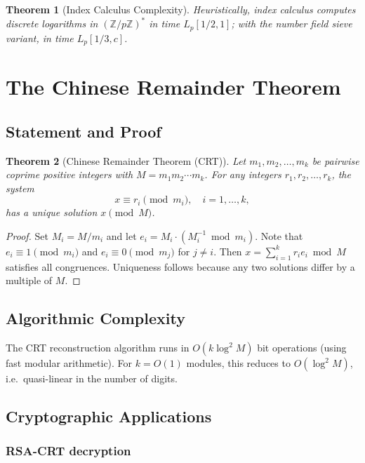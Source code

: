 \documentclass[12pt,a4paper]{amsart}
\newtheorem{theorem}{Theorem}[section]
\theoremstyle{definition}
\begin{document}
\begin{theorem}[Index Calculus Complexity]
Heuristically, index calculus computes discrete logarithms in
$(\mathbb{Z}/p\mathbb{Z})^*$ in time $L_p[1/2, 1]$; with the number field
sieve variant, in time $L_p[1/3, c]$.
\end{theorem}

\section{The Chinese Remainder Theorem}

\subsection{Statement and Proof}

\begin{theorem}[Chinese Remainder Theorem (CRT)]
Let $m_1, m_2, \ldots, m_k$ be pairwise coprime positive integers with
$M = m_1 m_2 \cdots m_k$. For any integers $r_1, r_2, \ldots, r_k$, the
system
\[
  x \equiv r_i \pmod{m_i}, \quad i = 1, \ldots, k,
\]
has a unique solution $x \pmod{M}$.
\end{theorem}

\begin{proof}
Set $M_i = M/m_i$ and let $e_i = M_i \cdot (M_i^{-1} \bmod m_i)$. Note that
$e_i \equiv 1 \pmod{m_i}$ and $e_i \equiv 0 \pmod{m_j}$ for $j \ne i$.
Then $x = \sum_{i=1}^k r_i e_i \bmod M$ satisfies all congruences. Uniqueness
follows because any two solutions differ by a multiple of $M$.
\end{proof}

\subsection{Algorithmic Complexity}

The CRT reconstruction algorithm runs in $O(k \log^2 M)$ bit operations (using
fast modular arithmetic). For $k = O(1)$ modules, this reduces to
$O(\log^2 M)$, i.e.\ quasi-linear in the number of digits.

\subsection{Cryptographic Applications}

\subsubsection*{RSA-CRT decryption}
\end{document}
